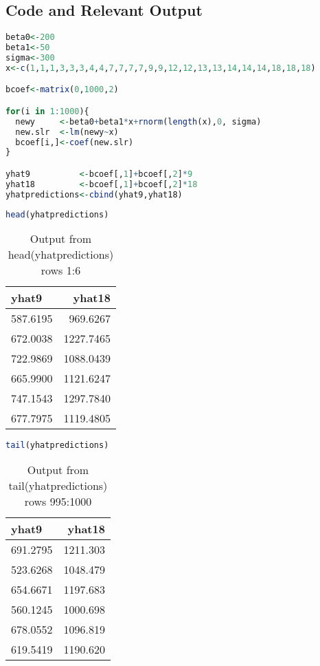 \documentclass[a4paper]{article}
\begin{document}
\subsection{Code and Relevant Output}
\begin{lstlisting}[language=R]
beta0<-200
beta1<-50
sigma<-300
x<-c(1,1,1,3,3,3,4,4,7,7,7,7,9,9,12,12,13,13,14,14,14,18,18,18)

bcoef<-matrix(0,1000,2)  

for(i in 1:1000){
  newy     <-beta0+beta1*x+rnorm(length(x),0, sigma)
  new.slr  <-lm(newy~x)
  bcoef[i,]<-coef(new.slr)
}

yhat9          <-bcoef[,1]+bcoef[,2]*9
yhat18         <-bcoef[,1]+bcoef[,2]*18
yhatpredictions<-cbind(yhat9,yhat18)
\end{lstlisting}

\pagebreak
\begin{lstlisting}[language=R]
head(yhatpredictions)
\end{lstlisting}

\begin{table}[H]
\centering
\begin{tabular}{l|r}
yhat9 & yhat18	 \\\hline
587.6195 & 969.6267\\
672.0038 & 1227.7465\\
722.9869 & 1088.0439\\
665.9900 & 1121.6247\\
747.1543 & 1297.7840\\
677.7975 & 1119.4805
\end{tabular}
\caption{\label{tab:widgets}Output from head(yhatpredictions) rows 1:6}
\end{table}

\begin{lstlisting}[language=R]
tail(yhatpredictions)
\end{lstlisting}

\begin{table}[H]
\centering
\begin{tabular}{l|r}
yhat9 & yhat18	 \\\hline
691.2795 & 1211.303\\
523.6268 & 1048.479\\
654.6671 & 1197.683\\
560.1245 & 1000.698\\
678.0552 & 1096.819\\
619.5419 & 1190.620
\end{tabular}
\caption{\label{tab:widgets}Output from tail(yhatpredictions) rows 995:1000}
\end{table}
\end{document}
